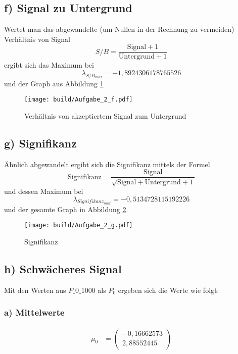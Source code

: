 \subsection*{f) Signal zu Untergrund}
Wertet man das abgewandelte (um Nullen in der Rechnung zu vermeiden) Verhältnis von Signal
\begin{equation}
    S/B=\frac{\text{Signal} +1}{\text{Untergrund}+1}
    \label{eqn:SB}
\end{equation}
ergibt sich das Maximum bei
\begin{equation}
    \lambda_{S/B_{max}}=-1,8924306178765526
\end{equation}
und der Graph aus Abbildung \ref{fig:SB}
\begin{figure}
  \texttt{[image: build/Aufgabe\_2\_f.pdf]}
  \caption{Verhältnis von akzeptiertem Signal zum Untergrund}
  \label{fig:SB}
\end{figure}

\subsection*{g) Signifikanz}
Ähnlich abgewandelt ergibt sich die Signifikanz mittels der Formel
\begin{equation}
    \text{Signifikanz}=\frac{\text{Signal}}{\sqrt{\text{Signal}+\text{Untergrund}+1}}
    \label{eqn:Signifikanz}
\end{equation}
und dessen Maximum bei
\begin{equation}
    \lambda_{Signifikanz_{max}}=-0,5134728115192226
\end{equation}
und der gesamte Graph in Abbildung \ref{fig:Signifikanz}.
\begin{figure}
  \texttt{[image: build/Aufgabe\_2\_g.pdf]}
  \caption{Signifikanz}
  \label{fig:Signifikanz}
\end{figure}

\subsection*{h) Schwächeres Signal}
Mit den Werten aus $P\_0\_1000$ als $P_0$ ergeben sich die Werte wie folgt:
\subsubsection*{a) Mittelwerte}
\begin{align}
    \mu_0&=\left(\begin{array}{c}-0,16662573\\2,88552445\end{array}\right)\\
    \end{align}

